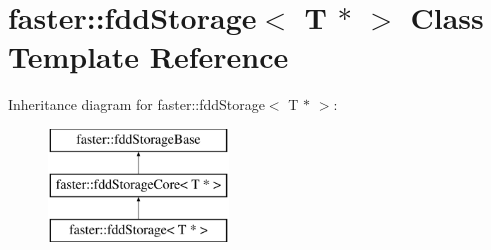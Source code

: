 \hypertarget{classfaster_1_1fddStorage_3_01T_01_5_01_4}{}\section{faster\+:\+:fdd\+Storage$<$ T $\ast$ $>$ Class Template Reference}
\label{classfaster_1_1fddStorage_3_01T_01_5_01_4}
Inheritance diagram for faster\+:\+:fdd\+Storage$<$ T $\ast$ $>$\+:\begin{figure}[H]
\begin{center}
\leavevmode
\includegraphics[height=3.000000cm]{classfaster_1_1fddStorage_3_01T_01_5_01_4}
\end{center}
\end{figure}
